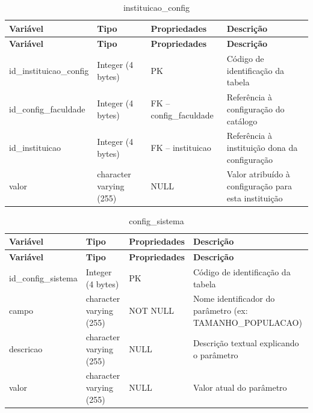 \Needspace{0.32\textheight}
\begin{longtable}{|L{5.2cm}|L{3.2cm}|L{2.4cm}|L{3.4cm}|}
\caption{instituicao\_config} \\
\hline
\textbf{Variável} & \textbf{Tipo} & \textbf{Propriedades} & \textbf{Descrição} \\
\hline
\endfirsthead
\hline
\textbf{Variável} & \textbf{Tipo} & \textbf{Propriedades} & \textbf{Descrição} \\
\hline
\endhead
id\_instituicao\_config & Integer (4 bytes) & PK & Código de identificação da tabela \\
\hline
id\_config\_faculdade & Integer (4 bytes) & FK – config\_faculdade & Referência à configuração do catálogo \\
\hline
id\_instituicao & Integer (4 bytes) & FK – instituicao & Referência à instituição dona da configuração \\
\hline
valor & character varying (255) & NULL & Valor atribuído à configuração para esta instituição \\
\hline
\end{longtable}

\fonteautores

\vspace{\baselineskip}

\Needspace{0.32\textheight}
\begin{longtable}{|L{5.2cm}|L{3.2cm}|L{2.4cm}|L{3.4cm}|}
\caption{config\_sistema} \\
\hline
\textbf{Variável} & \textbf{Tipo} & \textbf{Propriedades} & \textbf{Descrição} \\
\hline
\endfirsthead
\hline
\textbf{Variável} & \textbf{Tipo} & \textbf{Propriedades} & \textbf{Descrição} \\
\hline
\endhead
id\_config\_sistema & Integer (4 bytes) & PK & Código de identificação da tabela \\
\hline
campo & character varying (255) & NOT NULL & Nome identificador do parâmetro (ex: TAMANHO\_POPULACAO) \\
\hline
descricao & character varying (255) & NULL & Descrição textual explicando o parâmetro \\
\hline
valor & character varying (255) & NULL & Valor atual do parâmetro \\
\hline
\end{longtable}

\fonteautores

\vspace{\baselineskip}

